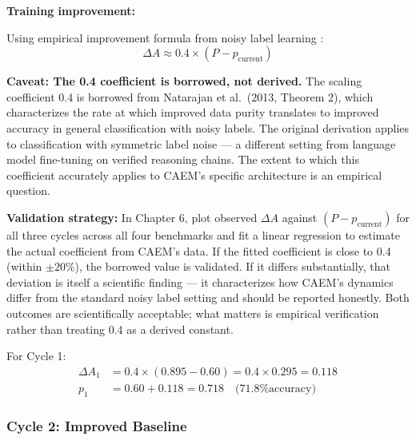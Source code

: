 \documentclass[12pt,a4paper]{article}
\theoremstyle{definition}
\begin{document}
\begin{examplebox}[title=Cycle 1 Detailed Calculation]
\textbf{Training improvement:}

Using empirical improvement formula from noisy label learning \cite{natarajan2013learning}:
\begin{equation}
\Delta A \approx 0.4 \times (P - p_{\text{current}})
\end{equation}

\begin{designbox}
\textbf{Caveat: The 0.4 coefficient is borrowed, not derived.} The scaling coefficient 0.4 is borrowed from Natarajan et al.\ (2013, Theorem 2), which characterizes the rate at which improved data purity translates to improved accuracy in general classification with noisy labels. The original derivation applies to classification with symmetric label noise — a different setting from language model fine-tuning on verified reasoning chains. The extent to which this coefficient accurately applies to CAEM's specific architecture is an empirical question.

\textbf{Validation strategy:} In Chapter 6, plot observed $\Delta A$ against $(P - p_{\text{current}})$ for all three cycles across all four benchmarks and fit a linear regression to estimate the actual coefficient from CAEM's data. If the fitted coefficient is close to 0.4 (within $\pm 20\%$), the borrowed value is validated. If it differs substantially, that deviation is itself a scientific finding — it characterizes how CAEM's dynamics differ from the standard noisy label setting and should be reported honestly. Both outcomes are scientifically acceptable; what matters is empirical verification rather than treating 0.4 as a derived constant.
\end{designbox}

For Cycle 1:
\begin{align}
\Delta A_1 &= 0.4 \times (0.895 - 0.60) = 0.4 \times 0.295 = 0.118 \\
p_1 &= 0.60 + 0.118 = 0.718 \quad \text{(71.8\% accuracy)}
\end{align}
\end{examplebox}

\subsubsection{Cycle 2: Improved Baseline}
\end{document}
